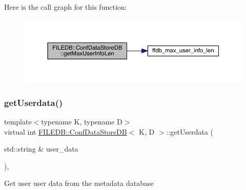 Here is the call graph for this function\+:
\nopagebreak
\begin{figure}[H]
\begin{center}
\leavevmode
\includegraphics[width=350pt]{d8/d19/classFILEDB_1_1ConfDataStoreDB_a0fc37111156b6c7080ff6a6831c847fc_cgraph}
\end{center}
\end{figure}
\mbox{\label{classFILEDB_1_1ConfDataStoreDB_abf7ce0847e1d68f960836826d68c0079}} 
\subsubsection{\texorpdfstring{getUserdata()}{getUserdata()}\hspace{0.1cm}{\footnotesize\ttfamily [1/2]}}
{\footnotesize\ttfamily template$<$typename K, typename D$>$ \\
virtual int \mbox{\hyperlink{classFILEDB_1_1ConfDataStoreDB}{F\+I\+L\+E\+D\+B\+::\+Conf\+Data\+Store\+DB}}$<$ K, D $>$\+::get\+Userdata (\begin{DoxyParamCaption}\item[{std\+::string \&}]{user\+\_\+data }\end{DoxyParamCaption})\hspace{0.3cm}{\ttfamily [inline]}, {\ttfamily [virtual]}}

Get user user data from the metadata database


